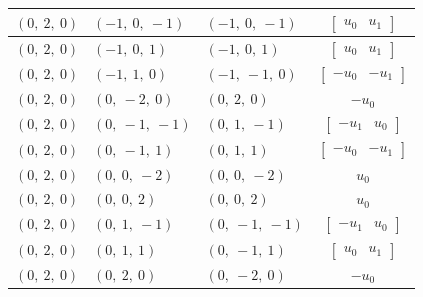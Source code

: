 \documentclass[11pt]{article}
\theoremstyle{definition}
\begin{document}
\begin{longtable}{|l|l|l|c|}
    \hline
    $\left( 0, \  2, \  0\right)$ & $\left( -1, \  0, \  -1\right)$ & $\left( -1, \  0, \  -1\right)$ & $\left[\begin{matrix}u_{0} & u_{1}\end{matrix}\right]$ \\
    \hline
    $\left( 0, \  2, \  0\right)$ & $\left( -1, \  0, \  1\right)$ & $\left( -1, \  0, \  1\right)$ & $\left[\begin{matrix}u_{0} & u_{1}\end{matrix}\right]$ \\
    \hline
    $\left( 0, \  2, \  0\right)$ & $\left( -1, \  1, \  0\right)$ & $\left( -1, \  -1, \  0\right)$ & $\left[\begin{matrix}- u_{0} & - u_{1}\end{matrix}\right]$ \\
    \hline
    $\left( 0, \  2, \  0\right)$ & $\left( 0, \  -2, \  0\right)$ & $\left( 0, \  2, \  0\right)$ & $- u_{0}$ \\
    \hline
    $\left( 0, \  2, \  0\right)$ & $\left( 0, \  -1, \  -1\right)$ & $\left( 0, \  1, \  -1\right)$ & $\left[\begin{matrix}- u_{1} & u_{0}\end{matrix}\right]$ \\
    \hline
    $\left( 0, \  2, \  0\right)$ & $\left( 0, \  -1, \  1\right)$ & $\left( 0, \  1, \  1\right)$ & $\left[\begin{matrix}- u_{0} & - u_{1}\end{matrix}\right]$ \\
    \hline
    $\left( 0, \  2, \  0\right)$ & $\left( 0, \  0, \  -2\right)$ & $\left( 0, \  0, \  -2\right)$ & $u_{0}$ \\
    \hline
    $\left( 0, \  2, \  0\right)$ & $\left( 0, \  0, \  2\right)$ & $\left( 0, \  0, \  2\right)$ & $u_{0}$ \\
    \hline
    $\left( 0, \  2, \  0\right)$ & $\left( 0, \  1, \  -1\right)$ & $\left( 0, \  -1, \  -1\right)$ & $\left[\begin{matrix}- u_{1} & u_{0}\end{matrix}\right]$ \\
    \hline
    $\left( 0, \  2, \  0\right)$ & $\left( 0, \  1, \  1\right)$ & $\left( 0, \  -1, \  1\right)$ & $\left[\begin{matrix}u_{0} & u_{1}\end{matrix}\right]$ \\
    \hline
    $\left( 0, \  2, \  0\right)$ & $\left( 0, \  2, \  0\right)$ & $\left( 0, \  -2, \  0\right)$ & $- u_{0}$ \\

\end{longtable}
\end{document}
